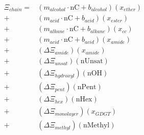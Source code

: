 \begin{align}
\begin{split}
\Xi_{chain} = & (m_{alcohol}\cdot \text{nC} + b_{alcohol})(x_{ether}) \\
            + & (m_{acid}\cdot \text{nC} + b_{acid})(x_{ester}) \\
            + & (m_{alkane}\cdot \text{nC} + b_{alkane})(x_{cc}) \\
            + & (m_{acid}\cdot \text{nC} + b_{acid})(x_{amide}) \\
            + & (\Delta\Xi_{amide})(x_{amide}) \\
            + & (\Delta\Xi_{unsat})(\text{nUnsat}) \\
            + & (\Delta\Xi_{hydroxyl})(\text{nOH}) \\
            + & (\Delta\Xi_{pent})(\text{nPent}) \\
            + & (\Delta\Xi_{hex})(\text{nHex}) \\
            + & (\Delta\Xi_{monolayer})(x_{GDGT}) \\
            + & (\Delta\Xi_{methyl})(\text{nMethyl}) \\
\end{split}
\end{align}



